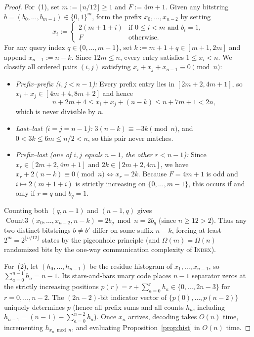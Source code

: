 \documentclass[11pt]{article}
\theoremstyle{plain}
\theoremstyle{definition}
\theoremstyle{remark}
\DeclareMathOperator{\CountThree}{Count3}
\begin{document}
\begin{proof}
For~(1), set $m := \lfloor n/12 \rfloor \ge 1$ and $F := 4m + 1$. Given any bitstring $b = (b_0, \dots, b_{m-1}) \in \{0, 1\}^m$, form the prefix $x_0, \dots, x_{n-2}$ by setting
\[
x_i := \begin{cases}
2(m + 1 + i) & \text{if } 0 \le i < m \text{ and } b_i = 1, \\
F & \text{otherwise.}
\end{cases}
\]
For any query index $q \in \{0, \dots, m-1\}$, set $k := m + 1 + q \in [m+1, 2m]$ and append $x_{n-1} := n - k$.
Since $12m \le n$, every entry satisfies $1 \le x_i < n$. We classify all ordered pairs $(i, j)$ satisfying $x_i + x_j + x_{n-1} \equiv 0 \pmod n$:
\begin{itemize}[leftmargin=2em]
\item \emph{Prefix--prefix ($i, j < n - 1$):} Every prefix entry lies in $[2m+2, 4m+1]$, so $x_i + x_j \in [4m+4, 8m+2]$ and hence
\[
n + 2m + 4 \le x_i + x_j + (n - k) \le n + 7m + 1 < 2n,
\]
which is never divisible by $n$.
\item \emph{Last--last ($i = j = n - 1$):} $3(n - k) \equiv -3k \pmod n$, and $0 < 3k \le 6m \le n/2 < n$, so this pair never matches.
\item \emph{Prefix--last (one of $i, j$ equals $n - 1$, the other $r < n - 1$):} Since $x_r \in [2m+2, 4m+1]$ and $2k \in [2m+2, 4m]$, we have $x_r + 2(n - k) \equiv 0 \pmod n \iff x_r = 2k$. Because $F = 4m+1$ is odd and $i \mapsto 2(m+1+i)$ is strictly increasing on $\{0,\dots,m-1\}$, this occurs if and only if $r = q$ and $b_q = 1$.
\end{itemize}
Counting both $(q, n-1)$ and $(n-1, q)$ gives $\CountThree(x_0, \dots, x_{n-2}, n - k) = 2b_q \bmod n = 2b_q$ (since $n \ge 12 > 2$).
Thus any two distinct bitstrings $b \neq b'$ differ on some suffix $n - k$, forcing at least $2^m = 2^{\lfloor n/12 \rfloor}$ states by the pigeonhole principle (and $\Omega(m) = \Omega(n)$ randomized bits by the one-way communication complexity of \textsc{Index}).

For~(2), let $(h_0, \dots, h_{n-1})$ be the residue histogram of $x_1, \dots, x_{n-1}$, so $\sum_{a=0}^{n-1} h_a = n - 1$.
Its stars-and-bars unary code places $n - 1$ separator zeros at the strictly increasing positions $p(r) = r + \sum_{a=0}^r h_a \in \{0, \dots, 2n-3\}$ for $r = 0, \dots, n-2$.
The $(2n-2)$-bit indicator vector of $\{p(0), \dots, p(n-2)\}$ uniquely determines $p$ (hence all prefix sums and all counts $h_a$, including $h_{n-1} = (n-1) - \sum_{a=0}^{n-2} h_a$).
Once $x_n$ arrives, decoding takes $O(n)$ time, incrementing $h_{x_n \bmod n}$, and evaluating Proposition~\ref{prop:hist} in $O(n)$ time.
\end{proof}
\end{document}

